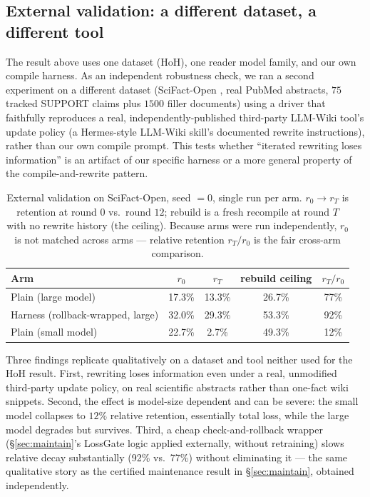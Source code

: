 \subsection{External validation: a different dataset, a different tool}
\label{sec:compile-external}

The result above uses one dataset (HoH), one reader model family, and our own compile harness. As an independent robustness check, we ran a second experiment on a different dataset (SciFact-Open \citep{scifact}, real PubMed abstracts, $75$ tracked SUPPORT claims plus $1500$ filler documents) using a driver that faithfully reproduces a real, independently-published third-party LLM-Wiki tool's update policy (a Hermes-style LLM-Wiki skill's documented rewrite instructions), rather than our own compile prompt. This tests whether ``iterated rewriting loses information'' is an artifact of our specific harness or a more general property of the compile-and-rewrite pattern.

\begin{table}[h]
\centering
\small
\caption{External validation on SciFact-Open, seed $=0$, single run per arm. $r_0{\to}r_T$ is retention at round $0$ vs.\ round $12$; rebuild is a fresh recompile at round $T$ with no rewrite history (the ceiling). Because arms were run independently, $r_0$ is not matched across arms --- relative retention $r_T/r_0$ is the fair cross-arm comparison.}
\label{tab:compile-external}
\begin{tabular}{lcccc}
\toprule
Arm & $r_0$ & $r_T$ & rebuild ceiling & $r_T/r_0$ \\
\midrule
Plain (large model) & 17.3\% & 13.3\% & 26.7\% & 77\% \\
Harness (rollback-wrapped, large) & 32.0\% & 29.3\% & 53.3\% & 92\% \\
Plain (small model) & 22.7\% & 2.7\% & 49.3\% & 12\% \\
\bottomrule
\end{tabular}
\end{table}

Three findings replicate qualitatively on a dataset and tool neither used for the HoH result. First, rewriting loses information even under a real, unmodified third-party update policy, on real scientific abstracts rather than one-fact wiki snippets. Second, the effect is model-size dependent and can be severe: the small model collapses to $12\%$ relative retention, essentially total loss, while the large model degrades but survives. Third, a cheap check-and-rollback wrapper (\S\ref{sec:maintain}'s LossGate logic applied externally, without retraining) slows relative decay substantially (92\% vs.\ 77\%) without eliminating it --- the same qualitative story as the certified maintenance result in \S\ref{sec:maintain}, obtained independently.

